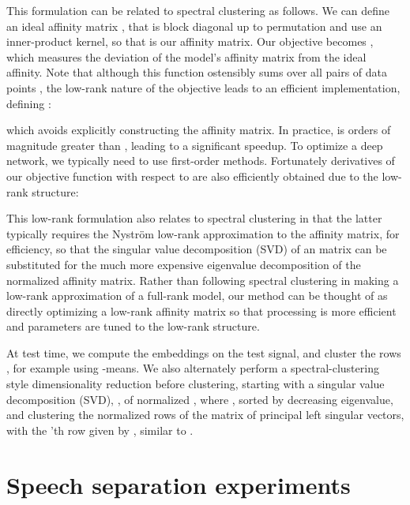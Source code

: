 \documentclass[9pt]{article} \usepackage{nips15submit_e,times}
\begin{document}
This formulation can be related to spectral clustering as follows. We can define an ideal affinity matrix , that is block diagonal up to permutation and use an inner-product kernel, so that  is our affinity matrix. Our objective becomes , which measures the deviation of the model's affinity matrix from the ideal affinity.
Note that although this function ostensibly sums over all pairs of data points , the low-rank nature of the objective leads to an efficient implementation, defining : 

which avoids explicitly constructing the  affinity matrix.  In practice,  is orders of magnitude greater than , leading to a significant speedup.
To optimize a deep network, we typically need to use first-order methods.   Fortunately derivatives of our objective function with respect to  are also efficiently obtained due to the low-rank structure: 


This low-rank formulation also relates to spectral clustering in that the latter typically requires the Nystr\"{o}m low-rank approximation to the affinity matrix, \cite{fowlkes2004spectral} for efficiency,  so that the singular value decomposition (SVD) of an  matrix can be substituted for the much more expensive eigenvalue decomposition of the  normalized affinity matrix.  Rather than following spectral clustering in making a low-rank approximation of a full-rank model, our method can be thought of as directly optimizing a low-rank affinity matrix so that processing is more efficient and parameters are tuned to the low-rank structure.

At test time, we compute the embeddings  on the test signal, and cluster the rows , for example using -means.  We also alternately perform a spectral-clustering style dimensionality reduction before clustering, starting with a singular value decomposition (SVD),  , of normalized , where  , sorted by decreasing eigenvalue, and clustering the normalized rows of the matrix of  principal left singular vectors, with the 'th row given by , similar to \cite{ng2002spectral}.  





\section{Speech separation experiments}
\label{sec:exp}
\end{document}
